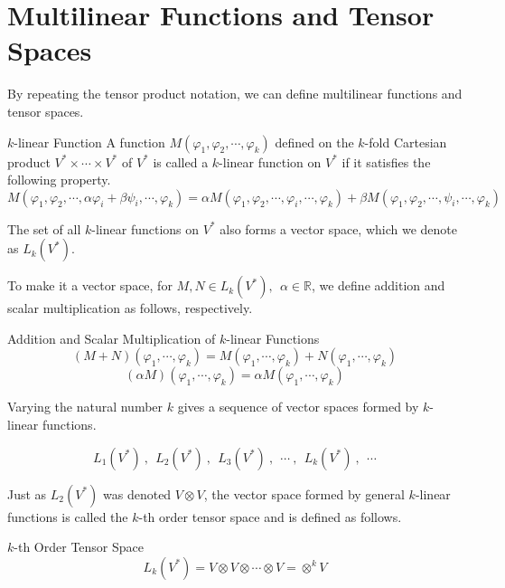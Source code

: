\documentclass[uplatex,a4j,12pt,dvipdfmx]{jsarticle}
\begin{document}
\section{Multilinear Functions and Tensor Spaces}

By repeating the tensor product notation, we can define multilinear functions and tensor spaces.

\begin{itembox}[l]{$k$-linear Function}
	A function
	$M(\varphi_{1}, \varphi_{2}, \cdots , \varphi_{k})$
	defined on the $k$-fold Cartesian product $V^{*} \times \cdots \times V^{*}$ of $V^{*}$
	is called a $k$-linear function on $V^{*}$
	if it satisfies the following property.
	$$
		M(\varphi_{1}, \varphi_{2}, \cdots , \alpha \varphi_{i} + \beta \psi_{i} , \cdots , \varphi_{k})
		=
		\alpha M(\varphi_{1}, \varphi_{2}, \cdots , \varphi_{i} , \cdots , \varphi_{k})
		+
		\beta M(\varphi_{1}, \varphi_{2}, \cdots , \psi_{i} , \cdots , \varphi_{k})
	$$
\end{itembox}

The set of all $k$-linear functions on $V^{*}$ also forms a vector space,
which we denote as
$L_{k}(V^{*})$.

To make it a vector space,
for $M, N \in L_{k}(V^{*}) , \ \ \alpha \in \mathbb{R}$,
we define addition and scalar multiplication as follows, respectively.

\begin{itembox}[l]{Addition and Scalar Multiplication of $k$-linear Functions}
	$$
		( M + N ) ( \varphi_{1} , \cdots, \varphi_{k})
		=
		M ( \varphi_{1} , \cdots, \varphi_{k})
		+
		N ( \varphi_{1} , \cdots, \varphi_{k})
	$$
	$$
		( \alpha  M ) ( \varphi_{1} , \cdots, \varphi_{k})
		=
		\alpha M ( \varphi_{1} , \cdots, \varphi_{k})
	$$
\end{itembox}

Varying the natural number $k$ gives a sequence of vector spaces formed by $k$-linear functions.

$$
	L_{1}(V^{*}) \ , \ \ L_{2}(V^{*}) \ , \ \ L_{3}(V^{*}) \ , \ \ \cdots \ , \ \ L_{k}(V^{*}) \ , \ \ \cdots
$$

Just as $L_{2}(V^{*})$ was denoted $V \otimes V$, the vector space formed by general $k$-linear functions
is called the $k$-th order tensor space and is defined as follows.

\begin{itembox}[l]{$k$-th Order Tensor Space}
	$$L_{k}(V^{*}) = V \otimes V \otimes \cdots \otimes V = \otimes^{k} V$$
\end{itembox}
\end{document}
